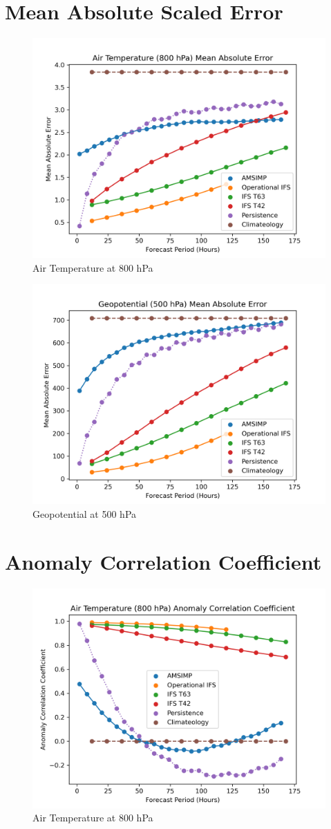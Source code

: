 \section{Mean Absolute Scaled Error}
\begin{figure}[H]
    \centering
    \includegraphics[width=.7\linewidth]{Plots/Results/Temperature/mean_absolute_error.png}
    \caption{Air Temperature at 800 hPa}
\end{figure}

\begin{figure}[H]
    \centering
    \includegraphics[width=.7\linewidth]{Plots/Results/Geopotential/mean_absolute_error.png}
    \caption{Geopotential at 500 hPa}
\end{figure}

\section{Anomaly Correlation Coefficient}
\begin{figure}[H]
    \centering
    \includegraphics[width=.7\linewidth]{Plots/Results/Temperature/anomaly_correlation_coefficient.png}
    \caption{Air Temperature at 800 hPa}
\end{figure}

